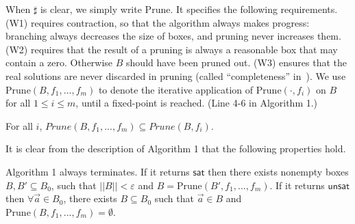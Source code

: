 \documentclass[prodmode]{acmsmall} %
\begin{document}
When $\sharp$ is clear, we simply write $\mathrm{Prune}$. It specifies the following requirements. (W1) requires contraction, so that the algorithm always makes progress: branching always decreases the size of boxes, and pruning never increases them. (W2) requires that the result of a pruning is always a reasonable box that may contain a zero. Otherwise $B$ should have been pruned out. (W3) ensures that the real solutions are never discarded in pruning (called ``completeness'' in~\cite{handbookICP}). 
We use $\mathrm{Prune}(B, f_1,...,f_m)$ to denote the iterative application of $\mathrm{Prune}(\cdot, f_i)$ on $B$ for all $1\leq i\leq m$, until a fixed-point is reached. (Line 4-6 in Algorithm 1.)
\begin{proposition}
For all $i$, $Prune(B,f_1,...,f_m)\subseteq Prune(B,f_i)$. 
\end{proposition}

It is clear from the description of Algorithm 1 that the following properties hold.
\begin{lemma}\label{key-lemma}
Algorithm 1 always terminates. If it returns $\mathsf{sat}$ then there exists nonempty boxes $B,B'\subseteq B_0$, such that $||B||<\varepsilon$ and $B=\mathrm{Prune}(B',f_1,...,f_m)$. If it returns $\mathsf{unsat}$ then $\forall\vec a\in B_0$, there exists $B\subseteq B_0$ such that $\vec a\in B$ and $\mathrm{Prune}(B,f_1,...,f_m)= \emptyset$. 
\end{lemma}
\end{document}
